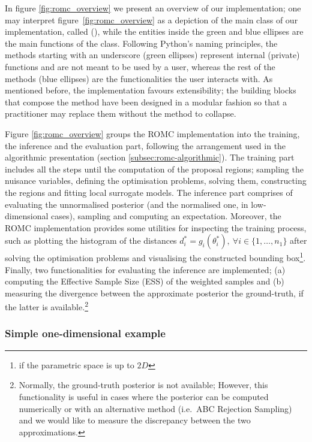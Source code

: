 In figure \ref{fig:romc_overview} we present an overview of our
implementation; one may interpret figure~\ref{fig:romc_overview} as a
depiction of the main class of our implementation, called
(), while the entities inside the green and blue
ellipses are the main functions of the class. Following Python's
naming principles, the methods starting with an underscore (green
ellipses) represent internal (private) functions and are not meant to
be used by a user, whereas the rest of the methods (blue ellipses) are
the functionalities the user interacts with. As mentioned before, the
implementation favours extensibility; the building blocks that compose
the method have been designed in a modular fashion so that a
practitioner may replace them without the method to collapse.

Figure \ref{fig:romc_overview} groups the ROMC implementation into the
training, the inference and the evaluation part, following the
arrangement used in the algorithmic presentation (section
\ref{subsec:romc-algorithmic}). The training part includes all the
steps until the computation of the proposal regions; sampling the
nuisance variables, defining the optimisation problems, solving them,
constructing the regions and fitting local surrogate models. The
inference part comprises of evaluating the unnormalised posterior (and
the normalised one, in low-dimensional cases), sampling and computing
an expectation. Moreover, the ROMC implementation provides some
utilities for inspecting the training process, such as plotting the
histogram of the distances
$d^*_i = g_i(\theta_i^*), \: \forall i \in \{1, \ldots, n_1 \}$ after
solving the optimisation problems and visualising the constructed
bounding box\footnote{if the parametric space is up to $2D$}. Finally,
two functionalities for evaluating the inference are implemented; (a)
computing the Effective Sample Size (ESS) of the weighted samples and
(b) measuring the divergence between the approximate posterior the
ground-truth, if the latter is available.\footnote{Normally, the
  ground-truth posterior is not available; However, this functionality
  is useful in cases where the posterior can be computed numerically
  or with an alternative method (i.e.\ ABC Rejection Sampling) and we
  would like to measure the discrepancy between the two
  approximations.}


\subsubsection*{Simple one-dimensional example}


